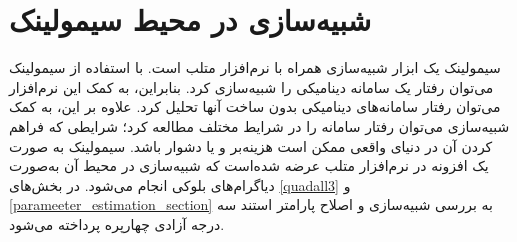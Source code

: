 \chapter{شبیه‌سازی  در محیط سیمولینک}
سیمولینک یک ابزار شبیه‌سازی همراه با نرم‌افزار متلب است.
با استفاده از سیمولینک می‌توان رفتار یک سامانه دینامیکی را شبیه‌سازی کرد. بنابراین، به کمک این نرم‌افزار می‌توان رفتار سامانه‌های دینامیکی بدون ساخت آنها تحلیل کرد. علاوه بر این، به کمک شبیه‌سازی می‌توان رفتار سامانه را در شرایط مختلف مطالعه کرد؛ شرایطی که فراهم کردن آن در دنیای واقعی ممکن است هزینه‌بر و  یا دشوار باشد. سیمولینک به صورت یک افزونه در نرم‌افزار متلب عرضه شده‌است که شبیه‌سازی در محیط آن به‌صورت دیاگرام‌های بلوکی انجام می‌شود. در بخش‌های
\ref{quadall3}
و
\ref{parameeter_estimation_section}
به بررسی شبیه‌سازی و اصلاح پارامتر استند سه درجه آزادی چهارپره پرداخته می‌شود.